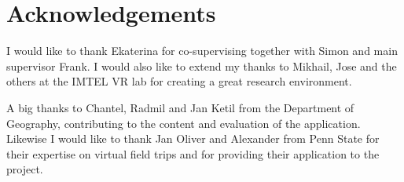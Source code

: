 \chapter*{Acknowledgements}
I would like to thank Ekaterina for co-supervising together with Simon and main supervisor Frank. I would also like to extend my thanks to Mikhail, Jose and the others at the IMTEL VR lab for creating a great research environment.

A big thanks to Chantel, Radmil and Jan Ketil from the Department of Geography, contributing to the content and evaluation of the application. Likewise I would like to thank Jan Oliver and Alexander from Penn State for their expertise on virtual field trips and for providing their application to the project.

